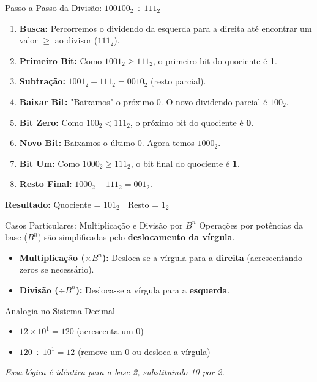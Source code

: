 \begin{frame}{Passo a Passo da Divisão: $100100_2 \div 111_2$}
    \small
    \begin{enumerate}
        \item \textbf{Busca:} Percorremos o dividendo da esquerda para a direita até encontrar um valor $\geq$ ao divisor ($111_2$).
        \item \textbf{Primeiro Bit:} Como $1001_2 \geq 111_2$, o primeiro bit do quociente é \textbf{1}.
        \item \textbf{Subtração:} $1001_2 - 111_2 = 0010_2$ (resto parcial).
        \item \textbf{Baixar Bit:} "Baixamos" o próximo $0$. O novo dividendo parcial é $100_2$.
        \item \textbf{Bit Zero:} Como $100_2 < 111_2$, o próximo bit do quociente é \textbf{0}.
        \item \textbf{Novo Bit:} Baixamos o último $0$. Agora temos $1000_2$.
        \item \textbf{Bit Um:} Como $1000_2 \geq 111_2$, o bit final do quociente é \textbf{1}.
        \item \textbf{Resto Final:} $1000_2 - 111_2 = 001_2$.
    \end{enumerate}

    \vspace{0.2cm}
    \centering
    \textbf{Resultado:} Quociente = $101_2$ | Resto = $1_2$
\end{frame}


\begin{frame}{Casos Particulares: Multiplicação e Divisão por $B^n$}
    Operações por potências da base ($B^n$) são simplificadas pelo \textbf{deslocamento da vírgula}.

    \begin{itemize}
        \item \textbf{Multiplicação ($\times B^n$):} Desloca-se a vírgula para a \textbf{direita} (acrescentando zeros se necessário).
        \item \textbf{Divisão ($\div B^n$):} Desloca-se a vírgula para a \textbf{esquerda}.
    \end{itemize}

    \begin{block}{Analogia no Sistema Decimal}
        \begin{itemize}
            \item $12 \times 10^1 = 120$ (acrescenta um 0)
            \item $120 \div 10^1 = 12$ (remove um 0 ou desloca a vírgula)
        \end{itemize}
    \end{block}

    \textit{Essa lógica é idêntica para a base 2, substituindo 10 por 2.}
\end{frame}

